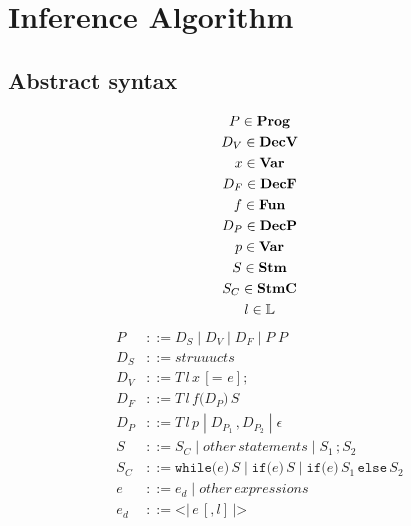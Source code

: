 
\section{Inference Algorithm}

\subsection{Abstract syntax}

\newcommand{\gp}{\; | \;} %

\begin{gather*}
  P \in \mathbf{Prog}\\
  D_V \in \mathbf{DecV}\\
  x \in \mathbf{Var}\\
  D_F \in \mathbf{DecF} \\
  f \in \mathbf{Fun}\\
  D_P \in \mathbf{DecP}\\
  p \in \mathbf{Var}\\
  S \in \mathbf{Stm}\\
  S_C \in \mathbf{StmC}\\
  l \in \mathbb{L}\\
\end{gather*}
\begin{align*}
  P       & ::= D_S \gp D_V \gp D_F \gp P \; P\\
  D_S     & ::= struuucts\\
  D_V     & ::= T \, l \, x \, [\texttt{= } e] \texttt{;}\\
  D_F     & ::= T \, l \, f \texttt{(} D_P \texttt{)} \, S\\
  D_P     & ::= T \, l \, p \gp D_{P_1} \, \texttt{,} \, D_{P_2} \gp \epsilon\\
  S       & ::= S_C \gp other \, statements \gp S_1 \, \texttt{;} \, S_2\\
  S_C     & ::= \texttt{while(} e \texttt{)} \, S \gp \texttt{if(} e \texttt{)} \, S \gp \texttt{if(} e \texttt{)} \, S_1 \, \texttt{else} \, S_2\\
  e       & ::= e_d \gp other \, expressions\\
  e_d     & ::= \texttt{<|} \, e \, [\texttt{,} \, l] \, \texttt{|>}
\end{align*}


